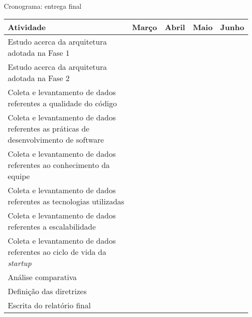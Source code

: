\begin{quadro}
    \caption{Cronograma: entrega final\label{quad:CronogramaTCC2}}
    \begin{tabular}{ | m{6.5cm} | c | c | c | c | }
    \hline
    \textbf{Atividade} &
        \textbf{Março} &
        \textbf{Abril} &
        \textbf{Maio} &
        \textbf{Junho} \\ \hline
    Estudo acerca da arquitetura adotada na Fase 1 &
        &
        &
        &
        \\ \hline
    Estudo acerca da arquitetura adotada na Fase 2 &
        &
        &
        &
        \\ \hline
    Coleta e levantamento de dados referentes a qualidade do código &
        &
        &
        &
        \\ \hline
    Coleta e levantamento de dados referentes as práticas de desenvolvimento de software &
        &
        &
        &
        \\ \hline
    Coleta e levantamento de dados referentes ao conhecimento da equipe &
        &
        &
        &
        \\ \hline
    Coleta e levantamento de dados referentes as tecnologias utilizadas &
        &
        &
        &
        \\ \hline
    Coleta e levantamento de dados referentes a escalabilidade &
        &
        &
        &
        \\ \hline
    Coleta e levantamento de dados referentes ao ciclo de vida da \textit{startup} &
        &
        &
        &
        \\ \hline
    Análise comparativa &
        &
        &
        &
        \\ \hline
    Definição das diretrizes &
        &
        &
        &
        \\ \hline
    Escrita do relatório final &
        &
        &
        &
        \\ \hline
    \end{tabular}
\end{quadro}
